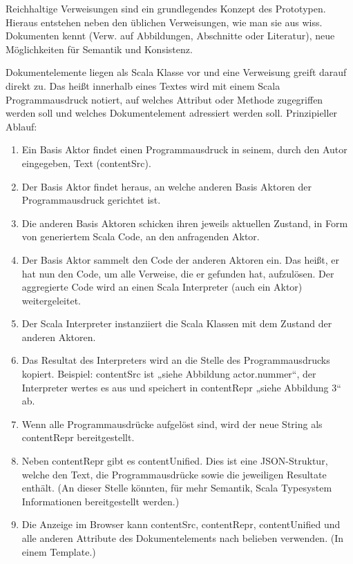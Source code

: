 Reichhaltige Verweisungen sind ein grundlegendes Konzept des Prototypen. Hieraus entstehen neben den üblichen Verweisungen, wie man sie aus wiss. Dokumenten kennt (Verw. auf Abbildungen, Abschnitte oder Literatur), neue Möglichkeiten für Semantik und Konsistenz.

 
Dokumentelemente liegen als Scala Klasse vor und eine Verweisung greift darauf direkt zu. Das heißt innerhalb eines Textes wird mit einem Scala Programmausdruck notiert, auf welches Attribut oder Methode zugegriffen werden soll und welches Dokumentelement adressiert werden soll. Prinzipieller Ablauf:

 
\begin{enumerate}

\item Ein Basis Aktor findet einen Programmausdruck in seinem, durch den Autor eingegeben, Text (contentSrc).
\item Der Basis Aktor findet heraus, an welche anderen Basis Aktoren der Programmausdruck gerichtet ist.
\item Die anderen Basis Aktoren schicken ihren jeweils aktuellen Zustand, in Form von generiertem Scala Code, an den anfragenden Aktor.
\item Der Basis Aktor sammelt den Code der anderen Aktoren ein. Das heißt, er hat nun den Code, um alle Verweise, die er gefunden hat, aufzulösen. Der aggregierte Code wird an einen Scala Interpreter (auch ein Aktor) weitergeleitet.
\item Der Scala Interpreter instanziiert die Scala Klassen mit dem Zustand der anderen Aktoren.
\item Das Resultat des Interpreters wird an die Stelle des Programmausdrucks kopiert. Beispiel: contentSrc ist „siehe Abbildung {actor.nummer}“, der Interpreter wertes es aus und speichert in contentRepr „siehe Abbildung 3“ ab.
\item Wenn alle Programmausdrücke aufgelöst sind, wird der neue String als contentRepr bereitgestellt.
\item Neben contentRepr gibt es contentUnified. Dies ist eine JSON-Struktur, welche den Text, die Programmausdrücke sowie die jeweiligen Resultate enthält. (An dieser Stelle könnten, für mehr Semantik, Scala Typesystem Informationen bereitgestellt werden.)
\item Die Anzeige im Browser kann contentSrc, contentRepr, contentUnified und alle anderen Attribute des Dokumentelements nach belieben verwenden. (In einem Template.)
\end{enumerate}
 
